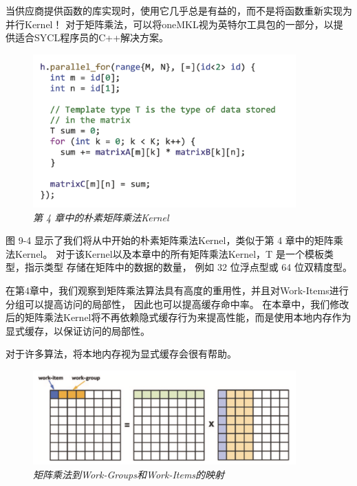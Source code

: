 \begin{remark}[使用供应商提供的库！]
当供应商提供函数的库实现时，使用它几乎总是有益的，而不是将函数重新实现为并行Kernel！
对于矩阵乘法，可以将oneMKL视为英特尔工具包的一部分，以提供适合SYCL程序员的C++解决方案。
\end{remark}

\begin{figure}[H]
	\centering
	\includegraphics[width=0.9\textwidth]{figs/F9.4.png}
	\caption{\textit{第 4 章中的朴素矩阵乘法Kernel }}
\end{figure}

图 9-4 显示了我们将从中开始的朴素矩阵乘法Kernel，类似于第 4 章中的矩阵乘法Kernel。
对于该Kernel以及本章中的所有矩阵乘法Kernel，T 是一个模板类型，指示类型 存储在矩阵中的数据的数量，
例如 32 位浮点型或 64 位双精度型。

在第4章中，我们观察到矩阵乘法算法具有高度的重用性，并且对Work-Items进行分组可以提高访问的局部性，
因此也可以提高缓存命中率。 
在本章中，我们修改后的矩阵乘法Kernel将不再依赖隐式缓存行为来提高性能，而是使用本地内存作为显式缓存，以保证访问的局部性。

\begin{remark}
	对于许多算法，将本地内存视为显式缓存会很有帮助。
\end{remark}

\begin{figure}[H]
	\centering
	\includegraphics[width=0.9\textwidth]{figs/F9.5.png}
	\caption{\textit{矩阵乘法到Work-Groups和Work-Items的映射 }}
\end{figure}

